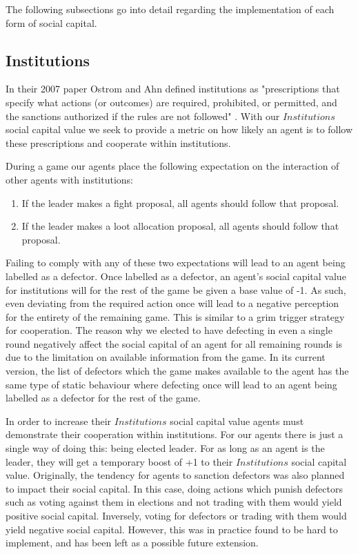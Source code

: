 The following subsections go into detail regarding the implementation of each form of social capital.

\subsection{Institutions}

In their 2007 paper Ostrom and Ahn defined institutions as "prescriptions that specify what actions (or outcomes) are required, prohibited, or permitted, and the sanctions authorized if the rules are not followed" \cite{ostrom-ahn}. With our $Institutions$ social capital value we seek to provide a metric on how likely an agent is to follow these prescriptions and cooperate within institutions. 

During a game our agents place the following expectation on the interaction of other agents with institutions:

\begin{enumerate}
    \item If the leader makes a fight proposal, all agents should follow that proposal.
    \item If the leader makes a loot allocation proposal, all agents should follow that proposal.
\end{enumerate}

Failing to comply with any of these two expectations will lead to an agent being labelled as a defector. Once labelled as a defector, an agent's social capital value for institutions will for the rest of the game be given a base value of -1. As such, even deviating from the required action once will lead to a negative perception for the entirety of the remaining game. This is similar to a grim trigger strategy for cooperation. The reason why we elected to have defecting in even a single round negatively affect the social capital of an agent for all remaining rounds is due to the limitation on available information from the game. In its current version, the list of defectors which the game makes available to the agent has the same type of static behaviour where defecting once will lead to an agent being labelled as a defector for the rest of the game.

In order to increase their $Institutions$ social capital value agents must demonstrate their cooperation within institutions. For our agents there is just a single way of doing this: being elected leader. For as long as an agent is the leader, they will get a temporary boost of +1 to their $Institutions$ social capital value. Originally, the tendency for agents to sanction defectors was also planned to impact their social capital. In this case, doing actions which punish defectors such as voting against them in elections and not trading with them would yield positive social capital. Inversely, voting for defectors or trading with them would yield negative social capital. However, this was in practice found to be hard to implement, and has been left as a possible future extension.

